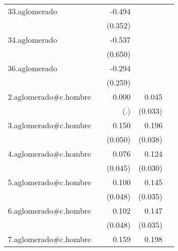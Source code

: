 {\begin{longtable}{l*{4}{D{.}{.}{-1}}}
\addlinespace
33.aglomerado&                     &      -0.494         &                     &                     \\
            &                     &     (0.352)         &                     &                     \\
\addlinespace
34.aglomerado&                     &      -0.537         &                     &                     \\
            &                     &     (0.650)         &                     &                     \\
\addlinespace
36.aglomerado&                     &      -0.294         &                     &                     \\
            &                     &     (0.259)         &                     &                     \\
\addlinespace
2.aglomerado#c.hombre&                     &       0.000         &       0.045         &                     \\
            &                     &         (.)         &     (0.033)         &                     \\
\addlinespace
3.aglomerado#c.hombre&                     &       0.150\sym{**} &       0.196\sym{***}&                     \\
            &                     &     (0.050)         &     (0.038)         &                     \\
\addlinespace
4.aglomerado#c.hombre&                     &       0.076         &       0.124\sym{***}&                     \\
            &                     &     (0.045)         &     (0.030)         &                     \\
\addlinespace
5.aglomerado#c.hombre&                     &       0.100\sym{*}  &       0.145\sym{***}&                     \\
            &                     &     (0.048)         &     (0.035)         &                     \\
\addlinespace
6.aglomerado#c.hombre&                     &       0.102\sym{*}  &       0.147\sym{***}&                     \\
            &                     &     (0.048)         &     (0.035)         &                     \\
\addlinespace
7.aglomerado#c.hombre&                     &       0.159\sym{**} &       0.198\sym{***}&                     \\

\end{longtable}}
